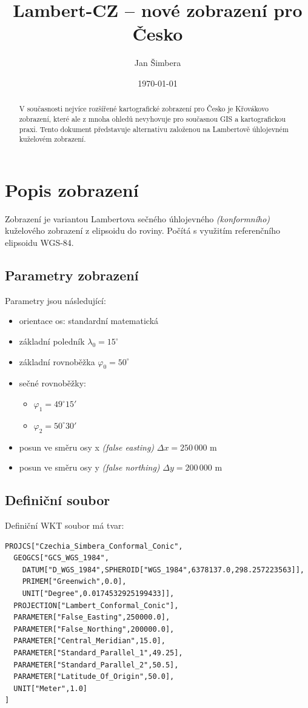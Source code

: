 \documentclass[a4paper]{article}
\title{Lambert-CZ -- nové zobrazení pro Česko}
\date{\today}
\author{Jan Šimbera}
\newcommand{\dg}{^{\circ}}
\begin{document}
\maketitle
\begin{abstract}
V současnosti nejvíce rozšířené kartografické zobrazení pro Česko je Křovákovo zobrazení, které ale z mnoha ohledů nevyhovuje pro současnou GIS a kartografickou praxi. Tento dokument představuje alternativu založenou na Lambertově úhlojevném kuželovém zobrazení.
\end{abstract}

\section{Popis zobrazení}
Zobrazení je variantou Lambertova sečného úhlojevného \emph{(konformního)} kuželového zobrazení z elipsoidu do roviny. Počítá s využitím referenčního elipsoidu WGS-84. 

\subsection{Parametry zobrazení}
Parametry jsou následující:
\begin{itemize}
  \item orientace os: standardní matematická
  \item základní poledník $\lambda_0 = 15\dg$
  \item základní rovnoběžka $\varphi_0 = 50\dg$
  \item sečné rovnoběžky:
    \begin{itemize}
      \item $\varphi_1 = 49\dg 15'$
      \item $\varphi_2 = 50\dg 30'$
    \end{itemize}
  \item posun ve směru osy x \emph{(false easting)} $\Delta x = 250\,000$ m
  \item posun ve směru osy y \emph{(false northing)} $\Delta y = 200\,000$ m
\end{itemize}

\subsection{Definiční soubor}
Definiční WKT soubor má tvar:
\begin{verbatim}
PROJCS["Czechia_Simbera_Conformal_Conic",
  GEOGCS["GCS_WGS_1984",
    DATUM["D_WGS_1984",SPHEROID["WGS_1984",6378137.0,298.257223563]],
    PRIMEM["Greenwich",0.0],
    UNIT["Degree",0.0174532925199433]],
  PROJECTION["Lambert_Conformal_Conic"],
  PARAMETER["False_Easting",250000.0],
  PARAMETER["False_Northing",200000.0],
  PARAMETER["Central_Meridian",15.0],
  PARAMETER["Standard_Parallel_1",49.25],
  PARAMETER["Standard_Parallel_2",50.5],
  PARAMETER["Latitude_Of_Origin",50.0],
  UNIT["Meter",1.0]
]
\end{verbatim}
\end{document}

